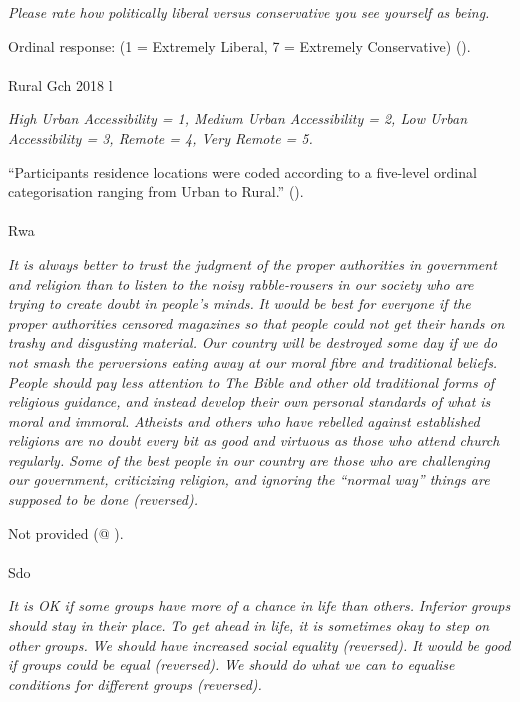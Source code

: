 \documentclass[
  single column]{article}
\makeatletter
\let\oldparagraph\paragraph
\renewcommand{\paragraph}{
    \@ifstar
      \xxxParagraphStar
      \xxxParagraphNoStar
  }
\newcommand{\xxxParagraphStar}[1]{\oldparagraph*{#1}\mbox{}}
\newcommand{\xxxParagraphNoStar}[1]{\oldparagraph{#1}\mbox{}}
\makeatother
\begin{document}
\emph{Please rate how politically liberal versus conservative you see
yourself as being.}

Ordinal response: (1 = Extremely Liberal, 7 = Extremely Conservative)
().

\paragraph{Rural Gch 2018 l}\label{rural-gch-2018-l}

\emph{High Urban Accessibility = 1, Medium Urban Accessibility = 2, Low
Urban Accessibility = 3, Remote = 4, Very Remote = 5.}

``Participants residence locations were coded according to a five-level
ordinal categorisation ranging from Urban to Rural.''
().

\paragraph{Rwa}\label{rwa}

\emph{It is always better to trust the judgment of the proper
authorities in government and religion than to listen to the noisy
rabble-rousers in our society who are trying to create doubt in people's
minds.} \emph{It would be best for everyone if the proper authorities
censored magazines so that people could not get their hands on trashy
and disgusting material.} \emph{Our country will be destroyed some day
if we do not smash the perversions eating away at our moral fibre and
traditional beliefs.} \emph{People should pay less attention to The
Bible and other old traditional forms of religious guidance, and instead
develop their own personal standards of what is moral and immoral.}
\emph{Atheists and others who have rebelled against established
religions are no doubt every bit as good and virtuous as those who
attend church regularly.} \emph{Some of the best people in our country
are those who are challenging our government, criticizing religion, and
ignoring the ``normal way'' things are supposed to be done (reversed).}

Not provided (@ ).

\paragraph{Sdo}\label{sdo}

\emph{It is OK if some groups have more of a chance in life than
others.} \emph{Inferior groups should stay in their place.} \emph{To get
ahead in life, it is sometimes okay to step on other groups.} \emph{We
should have increased social equality (reversed).} \emph{It would be
good if groups could be equal (reversed).} \emph{We should do what we
can to equalise conditions for different groups (reversed).}
\end{document}
